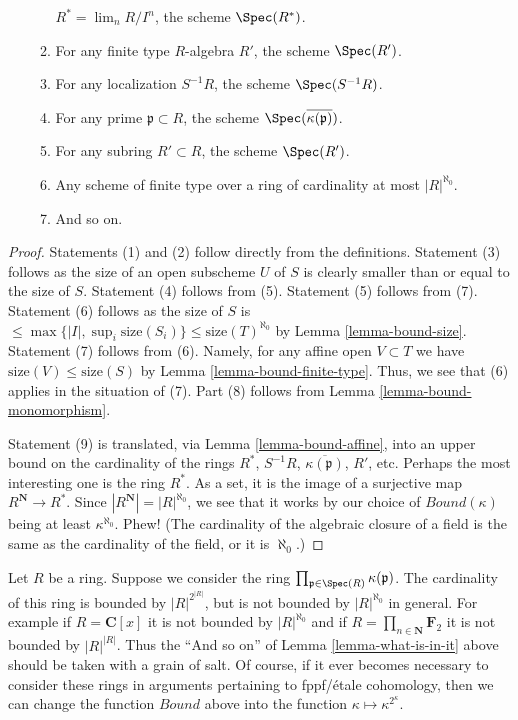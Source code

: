 \begin{lemma}
\begin{enumerate}
\begin{enumerate}
$R^* = \lim_n R/I^n$, the scheme $\Spec(R^*)$.
\item For any finite type $R$-algebra $R'$, the
scheme $\Spec(R')$.
\item For any localization $S^{-1}R$, the scheme $\Spec(S^{-1}R)$.
\item For any prime $\mathfrak p \subset R$, the scheme
$\Spec(\overline{\kappa(\mathfrak p)})$.
\item For any subring $R' \subset R$, the scheme
$\Spec(R')$.
\item Any scheme of finite type over a ring of cardinality at most
$|R|^{\aleph_0}$.
\item And so on.
\end{enumerate}
\end{enumerate}
\end{lemma}

\begin{proof}
Statements (1) and (2) follow directly from the definitions.
Statement (3) follows as the size of an open subscheme $U$ of $S$ is
clearly smaller than or equal to the size of $S$.
Statement (4) follows from (5).
Statement (5) follows from (7).
Statement (6) follows as the size of $S$ is
$\leq \max\{|I|, \sup_i \text{size}(S_i)\} \leq \text{size}(T)^{\aleph_0}$
by Lemma \ref{lemma-bound-size}. Statement (7) follows from (6).
Namely, for any affine open $V \subset T$ we have
$\text{size}(V) \leq \text{size}(S)$ by
Lemma \ref{lemma-bound-finite-type}.
Thus, we see that (6) applies in the situation of (7).
Part (8) follows from
Lemma \ref{lemma-bound-monomorphism}.

\medskip\noindent
Statement (9) is translated, via Lemma \ref{lemma-bound-affine},
into an upper bound on the cardinality of the rings
$R^*$, $S^{-1}R$, $\overline{\kappa(\mathfrak p)}$, $R'$, etc.
Perhaps the most interesting one is the ring $R^*$. As a
set, it is the image of a surjective map $R^{\mathbf{N}} \to R^*$.
Since $|R^{\mathbf{N}}| = |R|^{\aleph_0}$, we see that
it works by our choice of $Bound(\kappa)$ being at least $\kappa^{\aleph_0}$.
Phew! (The cardinality of the algebraic closure of a field
is the same as the cardinality of the field, or it is $\aleph_0$.)
\end{proof}

\begin{remark}
\label{remark-what-is-not-in-it}
Let $R$ be a ring. Suppose we consider the ring
$\prod_{\mathfrak p \in \Spec(R)} \kappa(\mathfrak p)$.
The cardinality of this ring is bounded by $|R|^{2^{|R|}}$,
but is not bounded by $|R|^{\aleph_0}$ in general.
For example if $R = \mathbf{C}[x]$ it is not bounded by
$|R|^{\aleph_0}$ and if $R = \prod_{n \in \mathbf{N}} \mathbf{F}_2$
it is not bounded by $|R|^{|R|}$.
Thus the ``And so on'' of Lemma \ref{lemma-what-is-in-it} above
should be taken with a grain of salt. Of course, if it ever becomes
necessary to consider these rings in arguments pertaining to
fppf/\'etale cohomology, then we can change the function
$Bound$ above into the function $\kappa \mapsto \kappa^{2^\kappa}$.
\end{remark}

